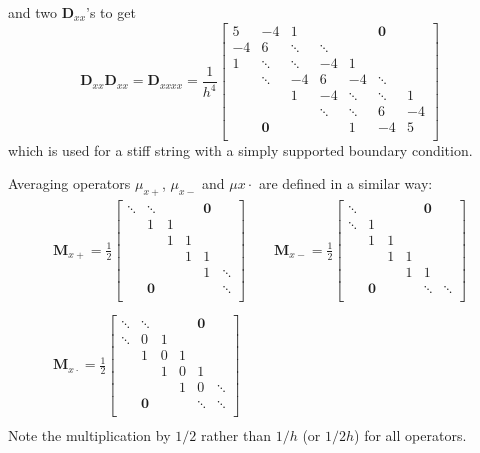\documentclass{article}
\def\Dxx{\mathbf{D}_{xx}}
\begin{document}
and two $\Dxx$'s to get
\begin{equation}
    \Dxx\Dxx = \mathbf{D}_{xxxx} = \frac{1}{h^4}\begin{bmatrix}
        5& -4 & 1 & & & \mathbf{0}& \\
        -4 & 6 &\ddots &\ddots & & & \\
        1& \ddots & \ddots & -4 & 1 & & \\
        & \ddots& -4 & 6 & -4 & \ddots& \\
        & & 1 & -4 & \ddots & \ddots &1 \\
        & & & \ddots & \ddots & 6 & -4 \\
        & \mathbf{0} & & & 1& -4 & 5 \\
    \end{bmatrix}
\end{equation}
which is used for a stiff string with a simply supported boundary condition.

Averaging operators $\mu_{x+}$, $\mu_{x-}$ and $\mu{x\cdot}$ are defined in a similar way:
\begin{gather*}
    \mathbf{M}_{x+} = \frac{1}{2}\begin{bmatrix}
        \ddots &\ddots & & & \mathbf{0}&\\
         & 1 & 1 & & & \\
        & & 1 & 1 & & \\
        & & & 1 & 1 & \\
        & & & & 1 & \ddots\\
        &\mathbf{0} & & & & \ddots \\
    \end{bmatrix}
    \qquad
    \mathbf{M}_{x-} = \frac{1}{2}\begin{bmatrix}
        \ddots & & & & \mathbf{0}&\\
        \ddots & 1 & & & & \\
        & 1 & 1 & & & \\
        & & 1 & 1 & & \\
        & & & 1 & 1 & \\
        &\mathbf{0} & & & \ddots & \ddots \\
    \end{bmatrix}\\
    \\
    \mathbf{M}_{x\cdot} = \frac{1}{2}\begin{bmatrix}
        \ddots &\ddots & & & \mathbf{0}&\\
        \ddots & 0 & 1 & & & \\
        & 1 & 0 & 1 & & \\
        & & 1 & 0 & 1 & \\
        & & & 1 & 0 & \ddots \\
        &\mathbf{0} & & & \ddots & \ddots \\
    \end{bmatrix}\\
\end{gather*}
Note the multiplication by $1/2$ rather than $1/h$ (or $1/2h$) for all operators.
\end{document}
